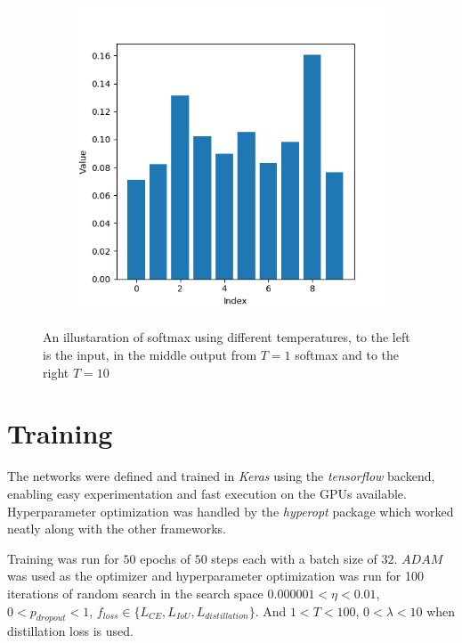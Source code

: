 \documentclass{kththesis}
\begin{document}
\begin{figure}[h]
\begin{subfigure}[b]{0.3\textwidth}
      \end{subfigure}
    ~
    \begin{subfigure}[b]{0.3\textwidth}
        \includegraphics[width=\textwidth]{softmaxT10}
      \end{subfigure}
     \caption{An illustaration of softmax using different temperatures, to the
       left is the input, in the middle output from \(T=1\) softmax and to the
       right \(T = 10\)}\label{fig:softmax}
\end{figure}

\section{Training}
The networks were defined and trained in \textit{Keras} \parencite{keras} using the
\textit{tensorflow} \parencite{tensorflow} backend, enabling easy
experimentation and fast execution on the GPUs available. Hyperparameter
optimization was handled by the \textit{hyperopt} \parencite{hyperopt} package which worked neatly
along with the other frameworks.

Training was run for \(50\) epochs of \(50\) steps each with a batch size of \(32\).
\(ADAM\) \parencite{ADAM} was used as the optimizer and hyperparameter
optimization was run for 100 iterations of random search in the search space
\(0.000001 < \eta < 0.01\), \( 0 < p_{dropout} < 1\), \(f_{loss} \in \{L_{CE},
L_{IoU}, L_{distillation}\}\). And \( 1 < T < 100\), \(0< \lambda <10\) when
distillation loss is used. 
\end{document}
